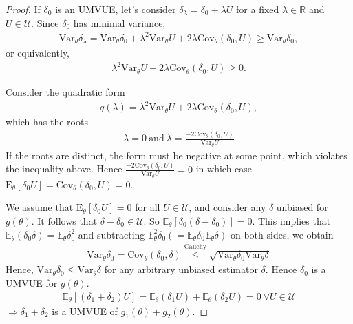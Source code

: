 \begin{proof}
    If $\delta_0$ is an UMVUE, 
    let's consider $\delta_\lambda=\delta_0 + \lambda{U}$ for a fixed $\lambda\in\mathbb{R}$ and $U\in\mathcal{U}$.
    Since $\delta_0$ has minimal variance,
    \begin{gather}
        \mathrm{Var}_\theta\delta_\lambda
        =\mathrm{Var}_\theta\delta_0+\lambda^2\mathrm{Var}_\theta{U}+2\lambda\mathrm{Cov}_\theta(\delta_0,U)
        \geq\mathrm{Var}_\theta\delta_0,
    \end{gather}
    or equivalently,
    \begin{gather}
        \lambda^2\mathrm{Var}_\theta{U}+2\lambda\mathrm{Cov}_\theta(\delta_0,U)\geq 0.
    \end{gather}

    Consider the quadratic form 
    \begin{gather}
        q(\lambda)=\lambda^2\mathrm{Var}_\theta{U}+2\lambda\mathrm{Cov}_\theta(\delta_0,U),
    \end{gather}
    which has the roots
    \begin{gather}
        \lambda=0~\text{and}~\lambda=\frac{-2\mathrm{Cov}_\theta(\delta_0,U)}{\mathrm{Var}_\theta{U}}
    \end{gather}
    If the roots are distinct, the form must be negative at some point,
    which violates the inequality above.
    Hence $\frac{-2\mathrm{Cov}_\theta(\delta_0,U)}{\mathrm{Var}_\theta{U}}=0$
    in which case $\mathrm{E}_\theta[\delta_0 U]=\mathrm{Cov}_\theta(\delta_0,U)=0$.

    We assume that $\mathrm{E}_\theta[\delta_0 U]=0$ for all $U\in\mathcal{U}$, 
    and consider any $\delta$ unbiased for $g(\theta)$. 
    It follows that $\delta-\delta_0\in\mathcal{U}$.
    So $\mathbb{E}_\theta[\delta_0(\delta-\delta_0)]=0$.
    This implies that $\mathbb{E}_\theta(\delta_0\delta)=\mathbb{E}_\theta\delta_0^2$ and 
    subtracting $\mathbb{E}_\theta^2\delta_0(=\mathbb{E}_\theta\delta_0\mathbb{E}_\theta\delta)$ on both sides,
    we obtain
    \begin{gather}
        \mathrm{Var}_\theta\delta_0=\mathrm{Cov}_\theta(\delta_0,\delta)
        \overset{\text{Cauchy}}{\leq}\sqrt{\mathrm{Var}_\theta\delta_0\mathrm{Var}_\theta\delta}
    \end{gather}
    Hence, $\mathrm{Var}_\theta\delta_0\leq\mathrm{Var}_\theta\delta$ for any arbitrary unbiased estimator $\delta$.
    Hence $\delta_0$ is a UMVUE for $g(\theta)$.
    \begin{gather}
        \mathbb{E}_\theta[(\delta_1+\delta_2)U]=\mathbb{E}_\theta(\delta_1U)+\mathbb{E}_\theta(\delta_2U) = 0~\forall{U}\in\mathcal{U}
    \end{gather}
    $\Rightarrow \delta_1+\delta_2$ is a UMVUE of $g_1(\theta)+g_2(\theta)$.
\end{proof}

